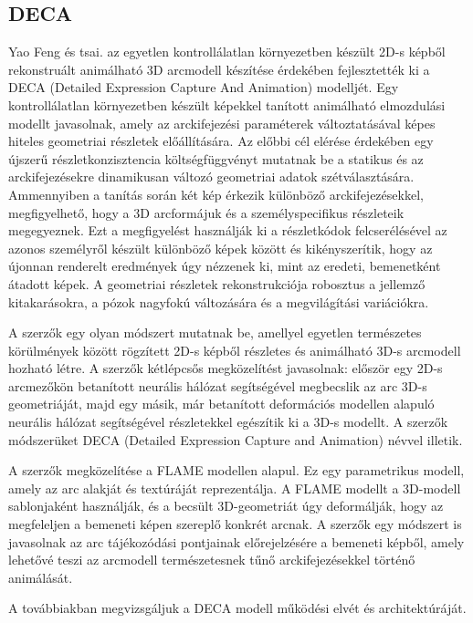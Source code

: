 \documentclass[12pt,a4]{article}
\begin{document}
        \subsection{DECA} \label{DECA}
 	
            Yao Feng és tsai.\cite{deca} az egyetlen kontrollálatlan környezetben készült 2D-s képből rekonstruált animálható 3D arcmodell készítése érdekében fejlesztették ki a DECA (Detailed Expression Capture And Animation) modelljét. Egy kontrollálatlan környezetben készült képekkel tanított animálható elmozdulási modellt javasolnak, amely az arckifejezési paraméterek változtatásával képes hiteles geometriai részletek előállítására. Az előbbi cél elérése érdekében egy újszerű részletkonzisztencia költségfüggvényt mutatnak be a statikus és az arckifejezésekre dinamikusan változó geometriai adatok szétválasztására. Ammennyiben a tanítás során két kép érkezik különböző arckifejezésekkel, megfigyelhető, hogy a 3D arcformájuk és a személyspecifikus részleteik megegyeznek. Ezt a megfigyelést használják ki a részletkódok felcserélésével az azonos személyről készült különböző képek között és kikényszerítik, hogy az újonnan renderelt eredmények úgy nézzenek ki, mint az eredeti, bemenetként átadott képek. A geometriai részletek rekonstrukciója robosztus a jellemző kitakarásokra, a pózok nagyfokú változására és a megvilágítási variációkra.
    
            A szerzők egy olyan módszert mutatnak be, amellyel egyetlen természetes körülmények között rögzített 2D-s képből részletes és animálható 3D-s arcmodell hozható létre. A szerzők kétlépcsős megközelítést javasolnak: először egy 2D-s arcmezőkön betanított neurális hálózat segítségével megbecslik az arc 3D-s geometriáját, majd egy másik, már betanított deformációs modellen alapuló neurális hálózat segítségével részletekkel egészítik ki a 3D-s modellt. A szerzők módszerüket DECA (Detailed Expression Capture and Animation) névvel illetik.
    
            A szerzők megközelítése a FLAME modellen alapul. Ez egy parametrikus modell, amely az arc alakját és textúráját reprezentálja. A FLAME modellt a 3D-modell sablonjaként használják, és a becsült 3D-geometriát úgy deformálják, hogy az megfeleljen a bemeneti képen szereplő konkrét arcnak. A szerzők egy módszert is javasolnak az arc tájékozódási pontjainak előrejelzésére a bemeneti képből, amely lehetővé teszi az arcmodell természetesnek tűnő arckifejezésekkel történő animálását.
    
        
     	      A továbbiakban megvizsgáljuk a DECA modell működési elvét és architektúráját.
\end{document}

